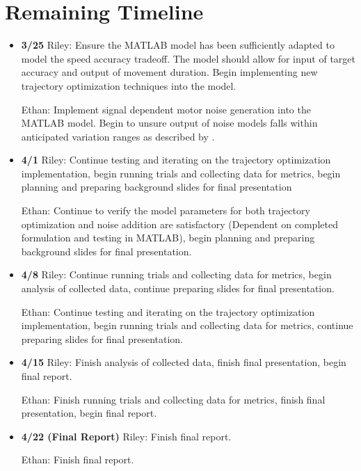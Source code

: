 \documentclass[table,12pt]{article}
\begin{document}
\section{Remaining Timeline}
\begin{itemize}

    \item \textbf{3/25} Riley: Ensure the MATLAB model has been sufficiently adapted to model the speed accuracy tradeoff. The model should allow for input of target accuracy and output of movement duration. Begin implementing new trajectory optimization techniques into the model.

    Ethan: Implement signal dependent motor noise generation into the MATLAB model. Begin to unsure output of noise models falls within anticipated variation ranges as described by \cite{c2}.

    \item \textbf{4/1} Riley: Continue testing and iterating on the trajectory optimization implementation, begin running trials and collecting data for metrics, begin planning and preparing background slides for final presentation

    Ethan: Continue to verify the model parameters for both trajectory optimization and noise addition are satisfactory (Dependent on completed formulation and testing in MATLAB), begin planning and preparing background slides for final presentation.

    \item \textbf{4/8} Riley: Continue running trials and collecting data for metrics, begin analysis of collected data, continue preparing slides for final presentation.

    Ethan: Continue testing and iterating on the trajectory optimization implementation, begin running trials and collecting data for metrics, continue preparing slides for final presentation.

    \item \textbf{4/15} Riley: Finish analysis of collected data, finish final presentation, begin final report.

    Ethan: Finish running trials and collecting data for metrics, finish final presentation, begin final report.

    \item \textbf{4/22 (Final Report)} Riley: Finish final report.

    Ethan: Finish final report.

\end{itemize}
\end{document}
